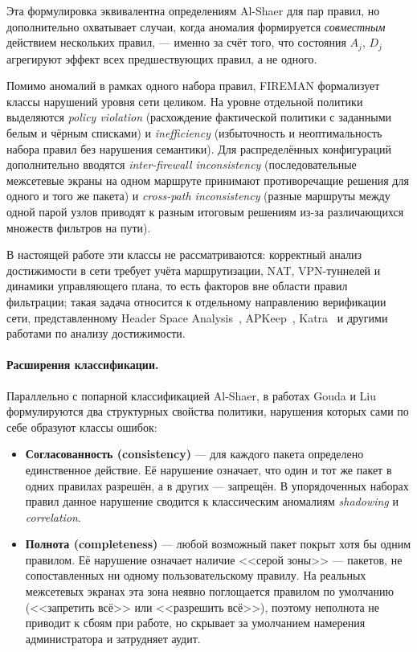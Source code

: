 Эта формулировка эквивалентна определениям Al-Shaer для пар правил, но дополнительно охватывает случаи, когда аномалия формируется \emph{совместным} действием нескольких правил, --- именно за счёт того, что состояния $A_j$, $D_j$ агрегируют эффект всех предшествующих правил, а не одного.

Помимо аномалий в рамках одного набора правил, FIREMAN формализует классы нарушений уровня сети целиком. На уровне отдельной политики выделяются \emph{policy violation} (расхождение фактической политики с заданными белым и чёрным списками) и \emph{inefficiency} (избыточность и неоптимальность набора правил без нарушения семантики). Для распределённых конфигураций дополнительно вводятся \emph{inter-firewall inconsistency} (последовательные межсетевые экраны на одном маршруте принимают противоречащие решения для одного и того же пакета) и \emph{cross-path inconsistency} (разные маршруты между одной парой узлов приводят к разным итоговым решениям из-за различающихся множеств фильтров на пути).

В настоящей работе эти классы не рассматриваются: корректный анализ достижимости в сети требует учёта маршрутизации, NAT, VPN-туннелей и динамики управляющего плана, то есть факторов вне области правил фильтрации; такая задача относится к отдельному направлению верификации сети, представленному Header Space Analysis~\cite{kazemian2012header}, APKeep~\cite{zhang2020apkeep}, Katra~\cite{beckett2022katra} и другими работами по анализу достижимости.

\paragraph{Расширения классификации.} Параллельно с попарной классификацией Al-Shaer, в работах Gouda и Liu~\cite{gouda2004firewall, gouda2007structured} формулируются два структурных свойства политики, нарушения которых сами по себе образуют классы ошибок:

\begin{itemize}
    \item \textbf{Согласованность (consistency)} --- для каждого пакета определено единственное действие. Её нарушение означает, что один и тот же пакет в одних правилах разрешён, а в других --- запрещён. В упорядоченных наборах правил данное нарушение сводится к классическим аномалиям \emph{shadowing} и \emph{correlation}.
    \item \textbf{Полнота (completeness)} --- любой возможный пакет покрыт хотя бы одним правилом. Её нарушение означает наличие <<серой зоны>> --- пакетов, не сопоставленных ни одному пользовательскому правилу. На реальных межсетевых экранах эта зона неявно поглощается правилом по умолчанию (<<запретить всё>> или <<разрешить всё>>), поэтому неполнота не приводит к сбоям при работе, но скрывает за умолчанием намерения администратора и затрудняет аудит.
\end{itemize}

